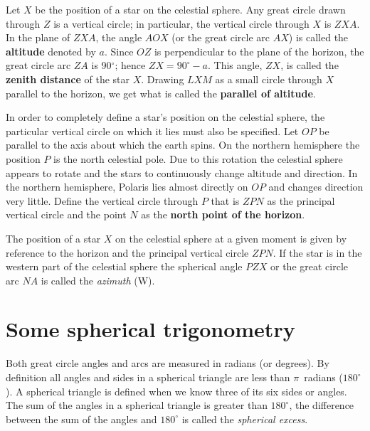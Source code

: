 Let $X$ be the position of a star on the celestial sphere. Any great
circle drawn through $Z$ is a vertical circle; in
particular, the vertical circle through $X$ is $ZXA$. In the plane of
$ZXA$, the angle $AOX$ (or the great circle arc $AX$) is called the
{\bf altitude} denoted by $a$. Since $OZ$ is perpendicular to the plane of
the horizon, the great circle arc $ZA$ is 90$^\circ$; hence
$ZX=90^\circ-a$. This angle, $ZX$, is called the {\bf zenith distance} of the star
$X$. Drawing $LXM$ as a small circle through $X$ parallel to the
horizon, we get what is called the {\bf parallel of altitude}. 

In order to completely define a star's position on the celestial sphere, the
particular vertical circle on which it lies must also be
specified. Let $OP$ be parallel to the axis about which the earth
spins. On the northern hemisphere the position $P$ is the
north celestial pole. Due to this rotation the celestial sphere
appears to rotate and the stars to continuously change altitude and
direction. In the northern hemisphere, Polaris lies almost directly on
$OP$ and changes direction very little. Define the vertical circle
through $P$ that is $ZPN$ as the principal vertical circle and the
point $N$ as the {\bf north point of the horizon}. 

The position of a star $X$ on the celestial sphere at a given moment
is given by reference to the horizon and the principal vertical circle
$ZPN$. If the star is in the western part of the celestial sphere the
spherical angle $PZX$ or the great circle arc $NA$ is called the
{\it azimuth} (W). 

\section{Some spherical trigonometry}

Both great circle angles and arcs are measured in radians (or
degrees). By definition all angles and sides in a spherical
triangle are less than $\pi$~radians ($180^\circ$). A spherical
triangle is defined when we know three of its six sides or angles. The
sum of the angles in a spherical triangle is greater than
$180^\circ$, the difference between the sum of the angles and
$180^\circ$ is called the {\it spherical excess}.

